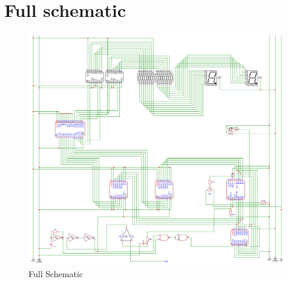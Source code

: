 \chapter{Full schematic}
\label{app:fullSchematic}
\begin{figure}[H]
    \centering
    \includegraphics[width=\textwidth]{images/fullSchematic.pdf}
    \caption{Full Schematic}
    \label{fig:fullSchematic}
\end{figure}

